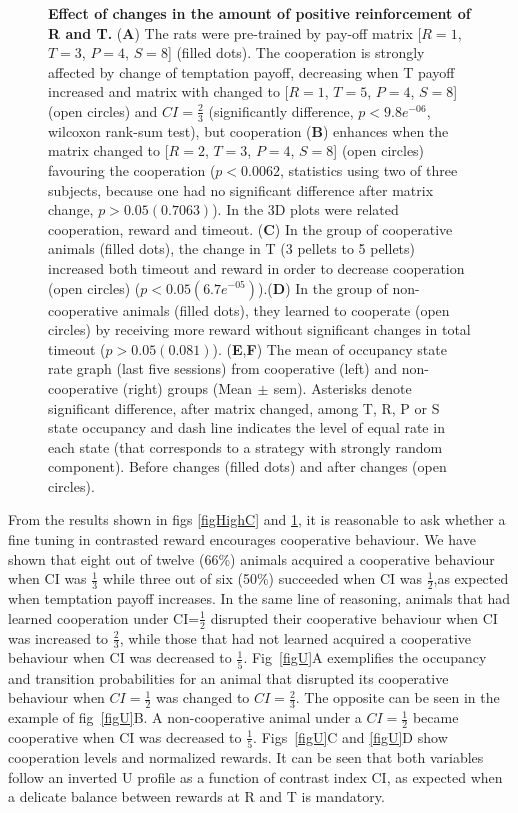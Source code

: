 \documentclass[10pt,letterpaper]{article}
\begin{document}
\begin{figure}[!h]
\caption{{\bf Effect of changes in the amount of positive reinforcement of R and T.} ({\bf A}) The rats were pre-trained by pay-off matrix [$R=1$, $T=3$, $P=4$, $S=8$] (filled dots). The cooperation is strongly affected by change of temptation payoff, decreasing when T payoff increased and matrix with changed to [$R=1$, $T=5$, $P=4$, $S=8$] (open circles) and $CI=\frac{2}{3}$ (significantly difference, $p< 9.8e^{-06}$, wilcoxon rank-sum test), but cooperation ({\bf B}) enhances when the matrix changed to [$R=2$, $T=3$, $P=4$, $S=8$] (open circles) favouring the cooperation  ($p<0.0062$, statistics using two of three subjects, because one had no significant difference after matrix change, $p>0.05(0.7063)$). In the 3D plots were related cooperation, reward and timeout. ({\bf C}) In the group of cooperative animals (filled dots), the change in T (3 pellets to 5 pellets) increased both timeout and reward in order to decrease cooperation (open circles) ($p<0.05(6.7e^{-05})$).({\bf D}) In the group of non-cooperative animals (filled dots), they learned to cooperate (open circles) by receiving more reward without significant changes in total timeout ($p>0.05(0.081)$). ({\bf E},{\bf F}) The mean of occupancy state rate graph (last five sessions) from cooperative (left) and non-cooperative (right) groups (Mean$\,\pm\,$sem). Asterisks denote significant difference, after matrix changed, among T, R, P or S state occupancy and dash line indicates the level of equal rate in each state (that corresponds to a strategy with strongly random component). Before changes (filled dots) and after changes (open circles).
}
\label{figModify}
\end{figure}

From the results shown in figs \ref{figHighC} and \ref{figModify}, it is reasonable to ask whether a fine tuning in contrasted reward encourages cooperative behaviour. We have shown that eight out of twelve (66\%) animals acquired a cooperative behaviour when CI was $\frac{1}{3}$ while three out of six (50\%) succeeded when CI was $\frac{1}{2}$,as expected when temptation payoff increases. In the same line of reasoning, animals that had learned cooperation under CI=$\frac{1}{2}$ disrupted their cooperative behaviour when CI was increased to $\frac{2}{3}$, while those that had not learned acquired a cooperative behaviour when CI was decreased to $\frac{1}{5}$. Fig~\ref{figU}A exemplifies the occupancy and transition probabilities for an animal that disrupted its cooperative behaviour when $CI=\frac{1}{2}$ was changed to $CI=\frac{2}{3}$. The opposite can be seen in the example of fig~\ref{figU}B. A non-cooperative animal under a $CI=\frac{1}{2}$ became cooperative when CI was decreased to $\frac{1}{5}$. Figs~\ref{figU}C and \ref{figU}D show cooperation levels and normalized rewards. It can be seen that both variables follow an inverted U profile as a function of contrast index CI, as expected when a delicate balance between rewards at R and T is mandatory.
\end{document}
